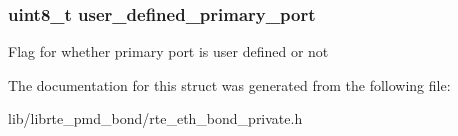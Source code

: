 \subsubsection[{user\+\_\+defined\+\_\+primary\+\_\+port}]{\setlength{\rightskip}{0pt plus 5cm}uint8\+\_\+t user\+\_\+defined\+\_\+primary\+\_\+port}\label{structbond__dev__private_a70188fdb8ba685a9505871dd8622d7fe}
Flag for whether primary port is user defined or not 

The documentation for this struct was generated from the following file\+:\begin{DoxyCompactItemize}
\item 
lib/librte\+\_\+pmd\+\_\+bond/rte\+\_\+eth\+\_\+bond\+\_\+private.\+h\end{DoxyCompactItemize}
